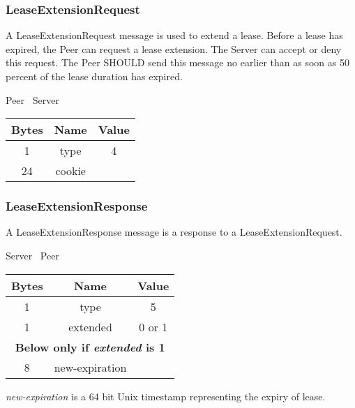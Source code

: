 \subsubsection{LeaseExtensionRequest}

A LeaseExtensionRequest message is used to extend a lease. Before a lease has expired, the Peer can
request a lease extension. The Server can accept or deny this request. The Peer SHOULD send this message no earlier
than as soon as 50 percent of the lease duration has expired.

\begin{center}
    Peer \textrightarrow\ Server\\
    \begin{tabular}{|c|c|c|}
        \hline
        \textbf{Bytes} & \textbf{Name} & \textbf{Value} \\
        \hline
        1              & type          & 4              \\
        \hline
        24             & cookie        &                \\
        \hline
    \end{tabular}
\end{center}

\subsubsection{LeaseExtensionResponse}

A LeaseExtensionResponse message is a response to a LeaseExtensionRequest.

\begin{center}
    Server \textrightarrow\ Peer\\
    \begin{tabular}{|c|c|c|}
        \hline
        \textbf{Bytes} & \textbf{Name}  & \textbf{Value} \\
        \hline
        1              & type           & 5              \\
        \hline
        1              & extended       & 0 or 1         \\
        \hline
        \multicolumn{3}{|c|}{\textbf{Below only if \emph{extended} is 1} } \\
        \hline
        8              & new-expiration &                \\
        \hline
    \end{tabular}
\end{center}

\emph{new-expiration} is a 64 bit Unix timestamp representing the expiry of lease.

